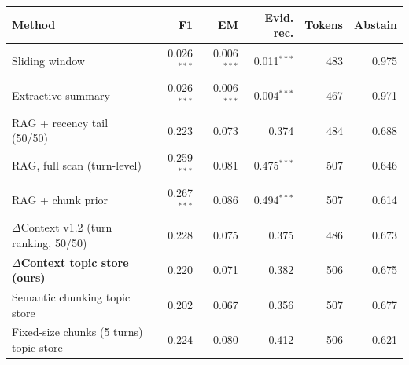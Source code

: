 \begin{tabular}{lrrrrr}
\toprule
Method & F1 & EM & Evid. rec. & Tokens & Abstain \\
\midrule
Sliding window & 0.026$^{***}$ & 0.006$^{***}$ & 0.011$^{***}$ & 483 & 0.975 \\
Extractive summary & 0.026$^{***}$ & 0.006$^{***}$ & 0.004$^{***}$ & 467 & 0.971 \\
RAG + recency tail (50/50) & 0.223 & 0.073 & 0.374 & 484 & 0.688 \\
RAG, full scan (turn-level) & 0.259$^{***}$ & 0.081 & 0.475$^{***}$ & 507 & 0.646 \\
RAG + chunk prior & 0.267$^{***}$ & 0.086 & 0.494$^{***}$ & 507 & 0.614 \\
$\Delta$Context v1.2 (turn ranking, 50/50) & 0.228 & 0.075 & 0.375 & 486 & 0.673 \\
\textbf{$\Delta$Context topic store (ours)} & 0.220 & 0.071 & 0.382 & 506 & 0.675 \\
Semantic chunking topic store & 0.202 & 0.067 & 0.356 & 507 & 0.677 \\
Fixed-size chunks (5 turns) topic store & 0.224 & 0.080 & 0.412 & 506 & 0.621 \\
\bottomrule
\end{tabular}
